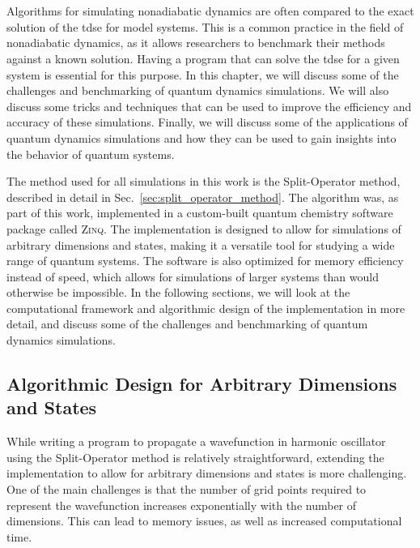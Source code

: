 \section{\filetotitle}
Algorithms for simulating nonadiabatic dynamics are often compared to the exact solution of the \acrshort{tdse} for model systems. This is a common practice in the field of nonadiabatic dynamics, as it allows researchers to benchmark their methods against a known solution. Having a program that can solve the \acrshort{tdse} for a given system is essential for this purpose. In this chapter, we will discuss some of the challenges and benchmarking of quantum dynamics simulations. We will also discuss some tricks and techniques that can be used to improve the efficiency and accuracy of these simulations. Finally, we will discuss some of the applications of quantum dynamics simulations and how they can be used to gain insights into the behavior of quantum systems.

The method used for all simulations in this work is the Split-Operator method, described in detail in Sec.~\ref{sec:split_operator_method}. The algorithm was, as part of this work, implemented in a custom-built quantum chemistry software package called \textsc{Zinq}.\supercite{10.5281/zenodo.18386143} The implementation is designed to allow for simulations of arbitrary dimensions and states, making it a versatile tool for studying a wide range of quantum systems. The software is also optimized for memory efficiency instead of speed, which allows for simulations of larger systems than would otherwise be impossible. In the following sections, we will look at the computational framework and algorithmic design of the implementation in more detail, and discuss some of the challenges and benchmarking of quantum dynamics simulations.

\subsection{Algorithmic Design for Arbitrary Dimensions and States}
While writing a program to propagate a wavefunction in harmonic oscillator using the Split-Operator method is relatively straightforward, extending the implementation to allow for arbitrary dimensions and states is more challenging. One of the main challenges is that the number of grid points required to represent the wavefunction increases exponentially with the number of dimensions. This can lead to memory issues, as well as increased computational time.

